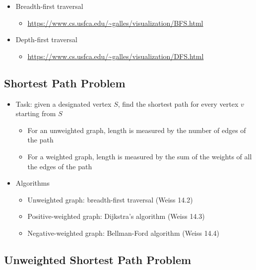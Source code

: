 \documentclass[
  10pt,
  english,
  letterpaper,
,tablecaptionabove
]{scrartcl}
\providecommand{\tightlist}{%
  \setlength{\itemsep}{0pt}\setlength{\parskip}{0pt}}
\begin{document}
\begin{itemize}
\tightlist
\item
  Breadth-first traversal

  \begin{itemize}
  \tightlist
  \item
    \url{https://www.cs.usfca.edu/~galles/visualization/BFS.html}
  \end{itemize}
\item
  Depth-first traversal

  \begin{itemize}
  \tightlist
  \item
    \url{https://www.cs.usfca.edu/~galles/visualization/DFS.html}
  \end{itemize}
\end{itemize}

\hypertarget{shortest-path-problem}{%
\subsection{Shortest Path Problem}\label{shortest-path-problem}}

\begin{itemize}
\tightlist
\item
  Task: given a designated vertex \(S\), find the shortest path for
  every vertex \(v\) starting from \(S\)

  \begin{itemize}
  \tightlist
  \item
    For an unweighted graph, length is measured by the number of edges
    of the path
  \item
    For a weighted graph, length is measured by the sum of the weights
    of all the edges of the path
  \end{itemize}
\item
  Algorithms

  \begin{itemize}
  \tightlist
  \item
    Unweighted graph: breadth-first traversal (Weiss 14.2)
  \item
    Positive-weighted graph: Dijkstra's algorithm (Weiss 14.3)
  \item
    Negative-weighted graph: Bellman-Ford algorithm (Weiss 14.4)
  \end{itemize}
\end{itemize}

\hypertarget{unweighted-shortest-path-problem}{%
\subsection{Unweighted Shortest Path
Problem}\label{unweighted-shortest-path-problem}}
\end{document}
